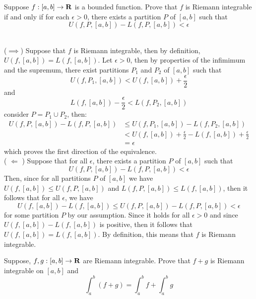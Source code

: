 \begin{exercise}
    Suppose $f : [a,b] \to \mathbf{R}$ is a bounded function. Prove that $f$ is Riemann integrable if and only if for each $\epsilon > 0$, there exists a partition $P$ of $[a,b]$ such that 
    $$U(f, P, [a,b]) - L(f, P, [a,b]) < \epsilon$$
\end{exercise}

\begin{solution}
    \\ ($\implies$) Suppose that $f$ is Riemann integrable, then by definition, $U(f, [a,b]) = L(f, [a,b])$. Let $\epsilon > 0$, then by properties of the infimimum and the supremum, there exist partitions $P_1$ and $P_2$ of $[a,b]$ such that
    $$U(f, P_1, [a,b]) < U(f, [a,b]) + \frac{\epsilon}{2} $$
    and 
    $$L(f, [a,b]) - \frac{\epsilon}{2} < L(f, P_2, [a,b])$$
    consider $P = P_1 \cup P_2$, then:
    \begin{align*}
        U(f,P, [a,b]) - L(f,P, [a,b]) &\leq U(f,P_1, [a,b]) - L(f,P_2, [a,b]) \\
        &< U(f, [a,b]) + \frac{\epsilon}{2} - L(f, [a,b]) + \frac{\epsilon}{2} \\
        &= \epsilon
    \end{align*}
    which proves the first direction of the equivalence. \\
    ( $\Longleftarrow$ ) Suppose that for all $\epsilon$, there exists a partition $P$ of $[a,b]$ such that 
    $$U(f, P, [a,b]) - L(f, P, [a,b]) < \epsilon$$
    Then, since for all partitions $P$ of $[a,b]$ we have $U(f, [a,b]) \leq U(f, P, [a,b])$ and $L(f, P, [a,b]) \leq L(f, [a,b])$, then it follows that for all $\epsilon$, we have
    $$U(f, [a,b]) - L(f, [a,b]) \leq U(f, P, [a,b]) - L(f, P, [a,b]) < \epsilon$$
    for some partition $P$ by our assumption. Since it holds for all $\epsilon > 0$ and since $U(f, [a,b]) - L(f, [a,b])$ is positive, then it follows that $U(f, [a,b]) = L(f, [a,b])$. By definition, this means that $f$ is Riemann integrable. \\
\end{solution}

\begin{exercise}
    Suppose, $f,g : [a,b] \to \mathbf{R}$ are Riemann integrable. Prove that $f+g$ is Riemann integrable on $[a,b]$ and
    $$\int_{a}^{b}(f+g) = \int_{a}^{b}f + \int_{a}^{b}g$$
\end{exercise}

